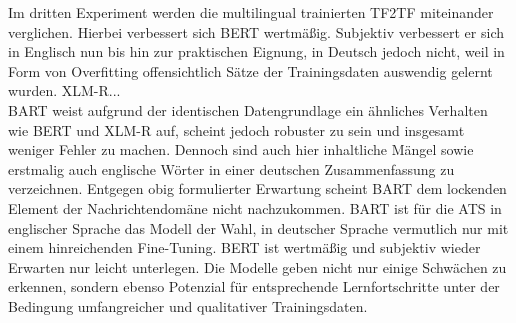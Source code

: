 \noindent
Im dritten Experiment werden die multilingual trainierten \ac{TF2TF} miteinander verglichen. Hierbei verbessert sich \ac{BERT} wertmäßig. Subjektiv verbessert er sich in Englisch nun bis hin zur praktischen Eignung, in Deutsch jedoch nicht, weil in Form von Overfitting offensichtlich Sätze der Trainingsdaten auswendig gelernt wurden. \ac{XLM-R}...\\ %
\ac{BART} weist aufgrund der identischen Datengrundlage ein ähnliches Verhalten wie \ac{BERT} und \ac{XLM-R} auf, scheint jedoch robuster zu sein und insgesamt weniger Fehler zu machen. Dennoch sind auch hier inhaltliche Mängel sowie erstmalig auch englische Wörter in einer deutschen Zusammenfassung zu verzeichnen. Entgegen obig formulierter Erwartung scheint \ac{BART} dem lockenden Element der Nachrichtendomäne nicht nachzukommen. \ac{BART} ist für die \ac{ATS} in englischer Sprache das Modell der Wahl, in deutscher Sprache vermutlich nur mit einem hinreichenden Fine-Tuning. \ac{BERT} ist wertmäßig und subjektiv wieder Erwarten nur leicht unterlegen. Die Modelle geben nicht nur einige Schwächen zu erkennen, sondern ebenso Potenzial für entsprechende Lernfortschritte unter der Bedingung umfangreicher und qualitativer Trainingsdaten.\\





